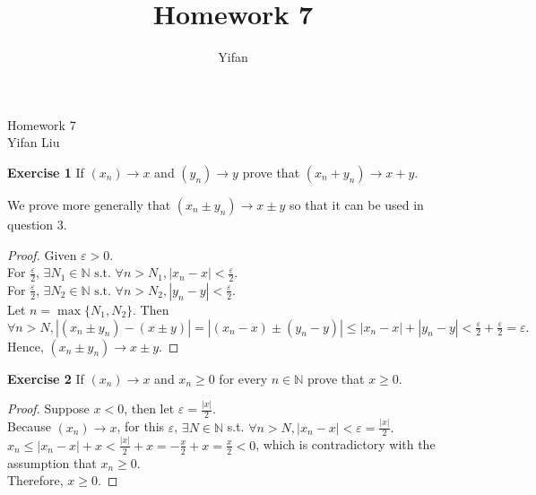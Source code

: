 \documentclass[12pt]{article}
\title{Homework 7}
\author{Yifan}
\newcommand{\bbN}{\mathbb{N}}
\theoremstyle{definition}
\numberwithin{equation}{subsection}
\begin{document}
\pagestyle{plain}



\begin{center}
{\large Homework 7} \\
\vspace{.2in}
Yifan Liu
\end{center}

\bigskip \bigskip



\textbf{Exercise 1} If $\left(x_{n}\right) \rightarrow x$ and $\left(y_{n}\right) \rightarrow y$ prove that $\left(x_{n}+y_{n}\right) \rightarrow x+y .$


We prove more generally that $\left(x_{n}\pm y_{n}\right) \rightarrow x\pm y $ so that it can be used in question 3. 
\begin{proof}
    Given $\varepsilon > 0$. \\
    For $\frac{\varepsilon}{2}$, $\exists N_1 \in \bbN \text{ s.t. } \forall n > N_1, |x_n - x| < \frac{\varepsilon}{2}$. \\
    For $\frac{\varepsilon}{2}$, $\exists N_2 \in \bbN \text{ s.t. } \forall n > N_2, |y_n - y| < \frac{\varepsilon}{2}$. \\
    Let $n = \max\{N_1, N_2\}$. Then $\forall n > N, |(x_n\pm y_n)-(x\pm y)| = |(x_n - x) \pm  (y_n - y) | \leq |x_n-x| + |y_n -y| < \frac{\varepsilon}{2} + \frac{\varepsilon}{2} = \varepsilon. $ \\
    Hence, $\left(x_{n}\pm y_{n}\right) \rightarrow x\pm y .$
\end{proof}


\textbf{Exercise 2} If $\left(x_{n}\right) \rightarrow x$ and $x_{n} \geq 0$ for every $n \in \mathbb{N}$ prove that $x \geq 0$.
\begin{proof}
    Suppose $x<0$, then let $\varepsilon = \frac{|x|}{2}$. \\
    Because $\left(x_{n}\right) \rightarrow x$, for this $\varepsilon$, $\exists N \in \bbN$ s.t. $\forall n > N, |x_n - x| < \varepsilon = \frac{|x|}{2}.$\\
    $x_n \leq |x_n -x| +x < \frac{|x|}{2}+x = -\frac{x}{2}+x = \frac{x}{2} < 0$, which is contradictory with the assumption that $x_{n} \geq 0$.\\
    Therefore, $x \geq 0$.
\end{proof}
\end{document}
